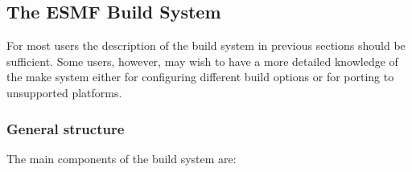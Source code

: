 

\subsection{The ESMF Build System}
\label{sec:make}
For most users the description of the build system in previous
sections should be sufficient.  Some users, however, may wish to have
a more detailed knowledge of the make system either for configuring
different build options or for porting to unsupported platforms.

\subsubsection{General structure}

The main components of the build system are:

